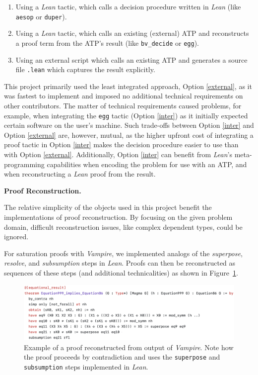 \begin{enumerate}
    \item Using a \emph{Lean} tactic, which calls a decision procedure written in \emph{Lean} (like \texttt{aesop} or \texttt{duper}).
    \item\label{inter} Using a \emph{Lean} tactic, which calls an existing (external) ATP and reconstructs a proof term from the ATP's result (like \texttt{bv\_decide} or \texttt{egg}).
    \item\label{external} Using an external script which calls an existing ATP and generates a source file \texttt{.lean} which captures the result explicitly.
\end{enumerate}

This project primarily used the least integrated approach, Option \ref{external}, as it was fastest to implement and imposed no additional technical requirements on other contributors.
The matter of technical requirements caused problems, for example, when integrating the \texttt{egg} tactic (Option \ref{inter}) as it initially expected certain software on the user's machine.
Such trade-offs between Option \ref{inter} and Option \ref{external} are, however, mutual, as the higher upfront cost of integrating a proof tactic in Option \ref{inter} makes the decision procedure easier to use than with Option \ref{external}.
Additionally, Option \ref{inter} can benefit from \emph{Lean}'s meta-programming capabilities when encoding the problem for use with an ATP, and when reconstructing a \emph{Lean} proof from the result.

\textbf{Proof Reconstruction.}

The relative simplicity of the objects used in this project benefit the implementations of proof reconstruction.
By focusing on the given problem domain, difficult reconstruction issues, like complex dependent types, could be ignored.

For saturation proofs with \emph{Vampire}, we implemented analogs of the \emph{superpose}, \emph{resolve}, and \emph{subsumption} steps in \emph{Lean}.
Proofs can then be reconstructed as sequences of these steps (and additional technicalities) as shown in Figure~\ref{fig:vampire-example}.

\begin{figure}
  \centering
  \includegraphics[width=\textwidth]{vampire-example.png}
  \caption{Example of a proof reconstructed from output of \emph{Vampire}. Note how the proof proceeds by contradiction and uses the \texttt{superpose} and \texttt{subsumption} steps implemented in \emph{Lean}.}
  \label{fig:vampire-example}
\end{figure}

